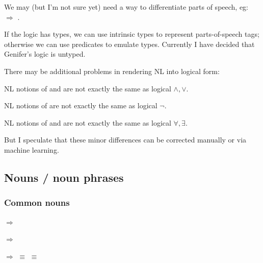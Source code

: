 We may (but I'm not sure yet) need a way to differentiate parts of speech, eg:\\
\tab {} $\Longrightarrow$ .

If the logic has types, we can use intrinsic types to represent parts-of-speech tags; otherwise we can use predicates to emulate types.  Currently I have decided that Genifer's logic is untyped.  %


There may be additional problems in rendering NL into logical form:
\begin{compactenum-}[\textbullet ]
\item NL notions of  and  are not exactly the same as logical $\wedge, \vee$.
\item NL notions of  are not exactly the same as logical $\neg$.
\item NL notions of  and  are not exactly the same as logical $\forall, \exists$.
\end{compactenum-}
But I speculate that these minor differences can be corrected manually or via machine learning.

\subsection{Nouns / noun phrases}


\subsubsection{Common nouns}

 $\Longrightarrow$ 

 $\Longrightarrow$ 

 $\Longrightarrow$  $\equiv$  $\equiv$ 

